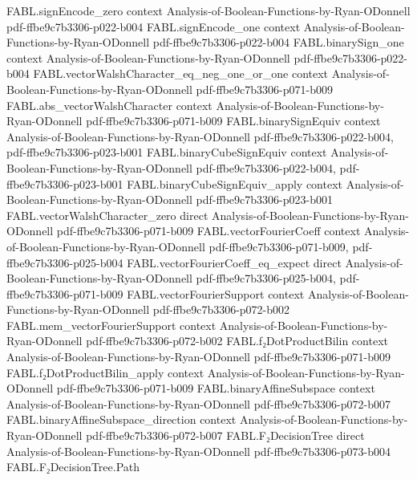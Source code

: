 \begin{theorem}
  {FABL.signEncode_zero}
  {context}
  {Analysis-of-Boolean-Functions-by-Ryan-ODonnell}
  {pdf-ffbe9c7b3306-p022-b004}
\proofstep
  {FABL.signEncode_one}
  {context}
  {Analysis-of-Boolean-Functions-by-Ryan-ODonnell}
  {pdf-ffbe9c7b3306-p022-b004}
\proofstep
  {FABL.binarySign_one}
  {context}
  {Analysis-of-Boolean-Functions-by-Ryan-ODonnell}
  {pdf-ffbe9c7b3306-p022-b004}
\proofstep
  {FABL.vectorWalshCharacter_eq_neg_one_or_one}
  {context}
  {Analysis-of-Boolean-Functions-by-Ryan-ODonnell}
  {pdf-ffbe9c7b3306-p071-b009}
\proofstep
  {FABL.abs_vectorWalshCharacter}
  {context}
  {Analysis-of-Boolean-Functions-by-Ryan-ODonnell}
  {pdf-ffbe9c7b3306-p071-b009}
\proofstep
  {FABL.binarySignEquiv}
  {context}
  {Analysis-of-Boolean-Functions-by-Ryan-ODonnell}
  {pdf-ffbe9c7b3306-p022-b004,
    pdf-ffbe9c7b3306-p023-b001}
\proofstep
  {FABL.binaryCubeSignEquiv}
  {context}
  {Analysis-of-Boolean-Functions-by-Ryan-ODonnell}
  {pdf-ffbe9c7b3306-p022-b004,
    pdf-ffbe9c7b3306-p023-b001}
\proofstep
  {FABL.binaryCubeSignEquiv_apply}
  {context}
  {Analysis-of-Boolean-Functions-by-Ryan-ODonnell}
  {pdf-ffbe9c7b3306-p023-b001}
\proofstep
  {FABL.vectorWalshCharacter_zero}
  {direct}
  {Analysis-of-Boolean-Functions-by-Ryan-ODonnell}
  {pdf-ffbe9c7b3306-p071-b009}
\proofstep
  {FABL.vectorFourierCoeff}
  {context}
  {Analysis-of-Boolean-Functions-by-Ryan-ODonnell}
  {pdf-ffbe9c7b3306-p071-b009,
    pdf-ffbe9c7b3306-p025-b004}
\proofstep
  {FABL.vectorFourierCoeff_eq_expect}
  {direct}
  {Analysis-of-Boolean-Functions-by-Ryan-ODonnell}
  {pdf-ffbe9c7b3306-p025-b004,
    pdf-ffbe9c7b3306-p071-b009}
\proofstep
  {FABL.vectorFourierSupport}
  {context}
  {Analysis-of-Boolean-Functions-by-Ryan-ODonnell}
  {pdf-ffbe9c7b3306-p072-b002}
\proofstep
  {FABL.mem_vectorFourierSupport}
  {context}
  {Analysis-of-Boolean-Functions-by-Ryan-ODonnell}
  {pdf-ffbe9c7b3306-p072-b002}
\proofstep
  {FABL.f₂DotProductBilin}
  {context}
  {Analysis-of-Boolean-Functions-by-Ryan-ODonnell}
  {pdf-ffbe9c7b3306-p071-b009}
\proofstep
  {FABL.f₂DotProductBilin_apply}
  {context}
  {Analysis-of-Boolean-Functions-by-Ryan-ODonnell}
  {pdf-ffbe9c7b3306-p071-b009}
\proofstep
  {FABL.binaryAffineSubspace}
  {context}
  {Analysis-of-Boolean-Functions-by-Ryan-ODonnell}
  {pdf-ffbe9c7b3306-p072-b007}
\proofstep
  {FABL.binaryAffineSubspace_direction}
  {context}
  {Analysis-of-Boolean-Functions-by-Ryan-ODonnell}
  {pdf-ffbe9c7b3306-p072-b007}
\proofstep
  {FABL.F₂DecisionTree}
  {direct}
  {Analysis-of-Boolean-Functions-by-Ryan-ODonnell}
  {pdf-ffbe9c7b3306-p073-b004}
\proofstep
  {FABL.F₂DecisionTree.Path}

\end{theorem}

